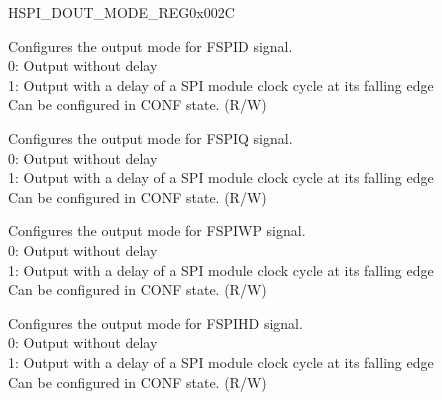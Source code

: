 \begin{register}{H}{SPI\_DOUT\_MODE\_REG}{0x002C}\label{regdesc:SPIDOUTMODEREG}
%
%
%
%
%
\regnewline%
\begin{regdesc}\begin{reglist}
\label{fielddesc:SPIDOUT0MODE}\item [SPI\_DOUT0\_MODE] Configures the output mode for FSPID signal. \\
0: Output without delay \\
1: Output with a delay of a SPI module clock cycle at its falling edge \\
Can be configured in CONF state. (R/W)
\label{fielddesc:SPIDOUT1MODE}\item [SPI\_DOUT1\_MODE] Configures the output mode for FSPIQ signal. \\
0: Output without delay \\
1: Output with a delay of a SPI module clock cycle at its falling edge \\
Can be configured in CONF state. (R/W)
\label{fielddesc:SPIDOUT2MODE}\item [SPI\_DOUT2\_MODE] Configures the output mode for FSPIWP signal. \\
0: Output without delay \\
1: Output with a delay of a SPI module clock cycle at its falling edge \\
Can be configured in CONF state. (R/W)
\label{fielddesc:SPIDOUT3MODE}\item [SPI\_DOUT3\_MODE] Configures the output mode for FSPIHD signal. \\
0: Output without delay \\
1: Output with a delay of a SPI module clock cycle at its falling edge \\
Can be configured in CONF state. (R/W)
\end{reglist}\end{regdesc}
\end{register}



